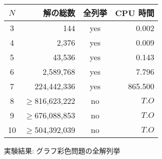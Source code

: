 \begin{tabular}{c|r|c|r}
 $N$ & 解の総数 & 全列挙 & CPU 時間 \\\hline
   3&         144&yes&   0.002\\
   4&       2,376&yes&   0.009\\
   5&      43,536&yes&   0.143\\
   6&   2,589,768&yes&   7.796\\
   7& 224,442,336&yes& 865.500\\
   8& $\geq$816,623,222 &no&$T.O$\\
   9& $\geq$676,088,853 &no&$T.O$\\
  10& $\geq$504,392,039 &no&$T.O$\\\hline
\end{tabular}
\caption{実験結果: グラフ彩色問題の全解列挙}
\label{table:enum}
